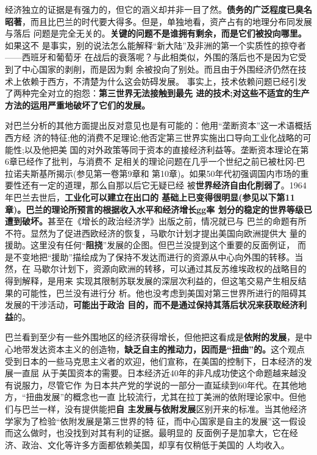 经济独立的证据是有强力的，但它的涵义却并非一目了然。\textbf{债务的广泛程度已臭名
  昭著}，而且比巴兰的时代要大得多。但是，单独地看，资产占有的地理分布同发展与落后
问题是完全无关的。\textbf{关键的问题不是谁拥有剩余，而是它们被投向哪里。}如果这不
是事实，别的说法怎么能解释“新大陆”及非洲的第一个实质性的掠夺者——西班牙和葡萄牙
在战后的衰落呢？与此相类似，外围的落后也不是因为它受到了中心国家的剥削，而是因为剩
余被投向了别处。而且由于外围经济仍然在技术上依赖于西方，不清楚为什么这会妨碍发展。
事实上，技术依赖问题已经引发了两种完全对立的抱怨：\textbf{第三世界无法接触到最先
  进的技术;对这些不适宜的生产方法的运用严重地破坏了它们的发展。}

对巴兰分析的其他方面提出反对意见也是有可能的：他用“垄断资本”这一术语概括西方经
济的特征;他的消费不足理论;他否定第三世界实施出口导向工业化战略的可能性;以及他把美
国的对外政策等同于资本的直接经济利益等。垄断资本理论在第6章已经作了批判，与消费不
足相关的理论问题在几乎一个世纪之前已被杜冈-巴拉诺夫斯基所揭示(参见第一卷第9章和
第10章)。如果50年代初强调国内市场的重要性还有一定的道理，那么自那以后它无疑已经
被\textbf{世界经济自由化削弱了}。1964年巴兰去世后，\textbf{工业化可以建立在出口的
  基础上已变得很明显(参见以下第11章)。巴兰的理论所预言的根据收入水平和经济增长gg率
  划分的稳定的世界等级已遭到破坏。}甚至在《增长的政治经济学》出版之前，情况就已与
巴兰的命题有所不符。显然为了促进西欧经济的恢复，马歇尔计划才提出美国向欧洲提供大
量的援助。这里没有任何“\textbf{阻挠}”发展的企图。但巴兰没提到这个重要的反面例证，
而是不变地把“援助”描绘成为了保持不发达而进行的资源从中心向外围的转移。当然，在
马歇尔计划下，资源向欧洲的转移，可以通过其反苏维埃政权的战略目的得到解释，是用来
实现其限制苏联发展的深层次利益的，但这笔交易产生相反结果的可能性，巴兰没有进行分
析。他也没考虑到美国对第三世界所进行的阻碍其发展的干涉活动，\textbf{可能出于政治
  目的，而不是通过保持其落后状况来获取经济利益}的。

巴兰看到至少有一些外围地区的经济获得增长，但他把这看成是\textbf{依附的发展}，是中
心地带发达资本主义的创造物，\textbf{缺乏自主的推动力，因而是“扭曲”的。}这个观点
受到日本的一些马克思主义者的欢迎，他们宣称，在美国的控制下，日本经济的发展一直屈
从于美国资本的需要。日本经济近40年的非凡成功使这个命题越来越没有说服力，尽管它作
为日本共产党的学说的一部分一直延续到60年代。在其他地方，“扭曲发展”的概念也一直
比较流行，尤其在拉丁美洲的依附理论家中。但他们与巴兰一样，没有提供能把\textbf{自
  主发展与依附发展}区别开来的标准。当其他经济学家为了检验“依附发展是第三世界的特
征，而中心国家是自主的发展”这一假设而这么做时，也没找到对其有利的证据。最明显的
反面例子是加拿大，它在经济、政治、文化等许多方面都依赖美国，却享有仅稍低于美国的
人均收入。

